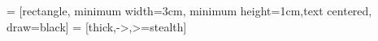 \usepackage{tikz}
\usetikzlibrary{shapes.geometric, arrows, fit, positioning}

 = [rectangle, minimum width=3cm, minimum height=1cm,text centered, draw=black]
 = [thick,->,>=stealth]

